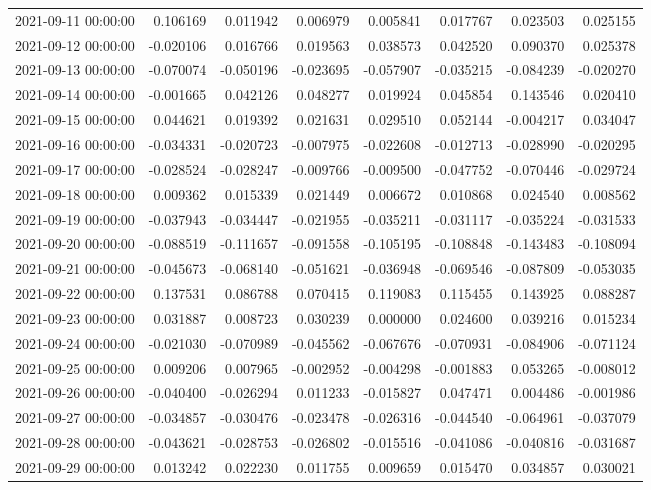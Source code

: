 \begin{tabular}{lrrrrrrr}
2021-09-11 00:00:00 & 0.106169 & 0.011942 & 0.006979 & 0.005841 & 0.017767 & 0.023503 & 0.025155 \\
2021-09-12 00:00:00 & -0.020106 & 0.016766 & 0.019563 & 0.038573 & 0.042520 & 0.090370 & 0.025378 \\
2021-09-13 00:00:00 & -0.070074 & -0.050196 & -0.023695 & -0.057907 & -0.035215 & -0.084239 & -0.020270 \\
2021-09-14 00:00:00 & -0.001665 & 0.042126 & 0.048277 & 0.019924 & 0.045854 & 0.143546 & 0.020410 \\
2021-09-15 00:00:00 & 0.044621 & 0.019392 & 0.021631 & 0.029510 & 0.052144 & -0.004217 & 0.034047 \\
2021-09-16 00:00:00 & -0.034331 & -0.020723 & -0.007975 & -0.022608 & -0.012713 & -0.028990 & -0.020295 \\
2021-09-17 00:00:00 & -0.028524 & -0.028247 & -0.009766 & -0.009500 & -0.047752 & -0.070446 & -0.029724 \\
2021-09-18 00:00:00 & 0.009362 & 0.015339 & 0.021449 & 0.006672 & 0.010868 & 0.024540 & 0.008562 \\
2021-09-19 00:00:00 & -0.037943 & -0.034447 & -0.021955 & -0.035211 & -0.031117 & -0.035224 & -0.031533 \\
2021-09-20 00:00:00 & -0.088519 & -0.111657 & -0.091558 & -0.105195 & -0.108848 & -0.143483 & -0.108094 \\
2021-09-21 00:00:00 & -0.045673 & -0.068140 & -0.051621 & -0.036948 & -0.069546 & -0.087809 & -0.053035 \\
2021-09-22 00:00:00 & 0.137531 & 0.086788 & 0.070415 & 0.119083 & 0.115455 & 0.143925 & 0.088287 \\
2021-09-23 00:00:00 & 0.031887 & 0.008723 & 0.030239 & 0.000000 & 0.024600 & 0.039216 & 0.015234 \\
2021-09-24 00:00:00 & -0.021030 & -0.070989 & -0.045562 & -0.067676 & -0.070931 & -0.084906 & -0.071124 \\
2021-09-25 00:00:00 & 0.009206 & 0.007965 & -0.002952 & -0.004298 & -0.001883 & 0.053265 & -0.008012 \\
2021-09-26 00:00:00 & -0.040400 & -0.026294 & 0.011233 & -0.015827 & 0.047471 & 0.004486 & -0.001986 \\
2021-09-27 00:00:00 & -0.034857 & -0.030476 & -0.023478 & -0.026316 & -0.044540 & -0.064961 & -0.037079 \\
2021-09-28 00:00:00 & -0.043621 & -0.028753 & -0.026802 & -0.015516 & -0.041086 & -0.040816 & -0.031687 \\
2021-09-29 00:00:00 & 0.013242 & 0.022230 & 0.011755 & 0.009659 & 0.015470 & 0.034857 & 0.030021 \\

\end{tabular}
